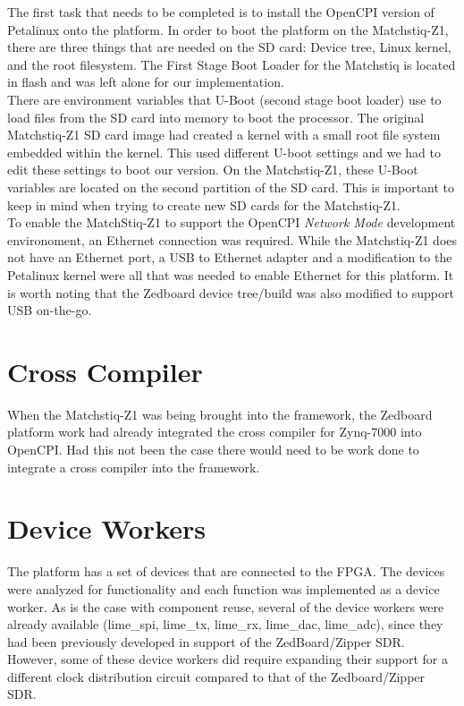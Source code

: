 \noindent The first task that needs to be completed is to install the OpenCPI version of Petalinux onto the platform.  In order to boot the platform on the Matchstiq-Z1, there are three things that are needed on the SD card: Device tree, Linux kernel, and the root filesystem.  The First Stage Boot Loader for the Matchstiq is located in flash and was left alone for our implementation.\\

\noindent There are environment variables that U-Boot (second stage boot loader) use to load files from the SD card into memory to boot the processor.  The original Matchstiq-Z1 SD card image had created a kernel with a small root file system embedded within the kernel. This used different U-boot settings and we had to edit these settings to boot our version. On the Matchstiq-Z1, these U-Boot variables are located on the second partition of the SD card. This is important to keep in mind when trying to create new SD cards for the Matchstiq-Z1. \\

\noindent To enable the MatchStiq-Z1 to support the OpenCPI \textit{Network Mode} development environoment, an Ethernet connection was required.  While the Matchstiq-Z1 does not have an Ethernet port,  a USB to Ethernet adapter and a modification to the Petalinux kernel were all that was needed to enable Ethernet for this platform. It is worth noting that the Zedboard device tree/build was also modified to support USB on-the-go.

\section{Cross Compiler}

When the Matchstiq-Z1 was being brought into the framework, the Zedboard platform work had already integrated the cross compiler for Zynq-7000 into OpenCPI.  Had this not been the case there would need to be work done to integrate a cross compiler into the framework.

\section{Device Workers}
The platform has a set of devices that are connected to the FPGA.  The devices were analyzed for functionality and each function was implemented as a device worker. As is the case with component reuse, several of the device workers were already available (lime\_spi, lime\_tx, lime\_rx, lime\_dac, lime\_adc), since they had been previously developed in support of the ZedBoard/Zipper SDR. However, some of these device workers did require expanding their support for a different clock distribution circuit compared to that of the Zedboard/Zipper SDR.

